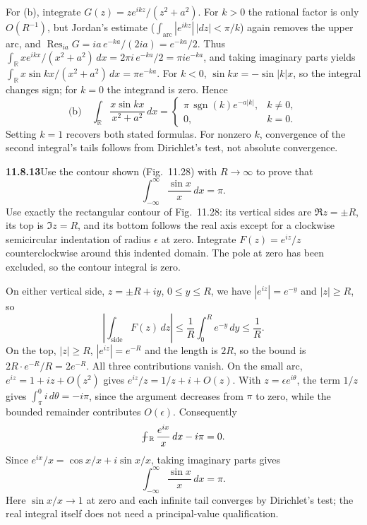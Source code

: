 For (b), integrate $G(z)=ze^{ikz}/(z^2+a^2)$. For $k>0$ the rational
factor is only $O(R^{-1})$, but Jordan's estimate
($\int_{\text{arc}}|e^{ikz}|\,|dz|<\pi/k$) again removes the upper arc,
and $\operatorname{Res}_{ia}G=ia\,e^{-ka}/(2ia)=e^{-ka}/2$. Thus
$\int_{\mathbb R}xe^{ikx}/(x^2+a^2)\,dx=2\pi i\,e^{-ka}/2=\pi ie^{-ka}$,
and taking imaginary parts yields
$\int_{\mathbb R}x\sin kx/(x^2+a^2)\,dx=\pi e^{-ka}$.
For $k<0$, $\sin kx=-\sin|k|x$, so the integral changes sign; for
$k=0$ the integrand is zero. Hence
\[
\boxed{\text{(b)}\quad
\int_{\mathbb R}\frac{x\sin kx}{x^2+a^2}\,dx
=\begin{cases}
\pi\,\operatorname{sgn}(k)e^{-a|k|},&k\ne0,\\
0,&k=0.
\end{cases}}
\]
Setting $k=1$ recovers both stated formulas.
For nonzero $k$, convergence of the second integral's tails follows
from Dirichlet's test, not absolute convergence.

\par\bigskip
\noindent\textbf{11.8.13}\quad Use the contour shown (Fig.~11.28) with
$R\to\infty$ to prove that
\[
\int_{-\infty}^{\infty}\frac{\sin x}{x}\,dx=\pi.
\]
\solution
Use exactly the rectangular contour of Fig.~11.28: its vertical sides
are $\Re z=\pm R$, its top is $\Im z=R$, and its bottom follows the
real axis except for a clockwise semicircular indentation of radius
$\epsilon$ at zero. Integrate $F(z)=e^{iz}/z$ counterclockwise
around this indented domain. The pole at zero has been excluded,
so the contour integral is zero.

On either vertical side, $z=\pm R+iy$, $0\le y\le R$, we have
$|e^{iz}|=e^{-y}$ and $|z|\ge R$, so
\[
\left|\int_{\text{side}}F(z)\,dz\right|
\le\frac1R\int_0^R e^{-y}\,dy\le\frac1R.
\]
On the top, $|z|\ge R$, $|e^{iz}|=e^{-R}$ and the length is $2R$,
so the bound is $2R\cdot e^{-R}/R=2e^{-R}$. All three contributions
vanish. On the small arc, $e^{iz}=1+iz+O(z^2)$ gives
$e^{iz}/z=1/z+i+O(z)$. With $z=\epsilon e^{i\theta}$, the term $1/z$
gives $\int_\pi^0 i\,d\theta=-i\pi$, since the argument decreases from
$\pi$ to zero, while the bounded remainder contributes $O(\epsilon)$.
Consequently
\[
\PVint_{\mathbb R}\frac{e^{ix}}x\,dx-i\pi=0.
\]
Since $e^{ix}/x=\cos x/x+i\sin x/x$, taking imaginary parts gives
\[
\boxed{\int_{-\infty}^{\infty}\frac{\sin x}{x}\,dx=\pi}.
\]
Here $\sin x/x\to1$ at zero and each infinite tail converges by
Dirichlet's test; the real integral itself does not need a
principal-value qualification.

